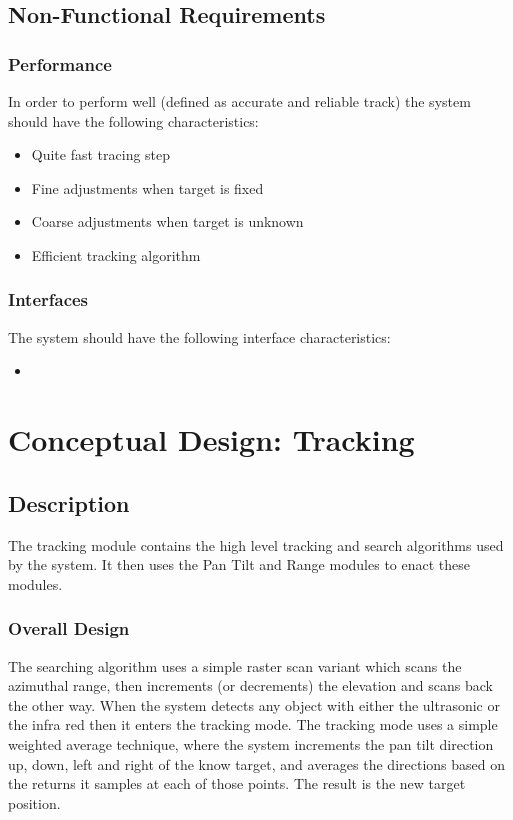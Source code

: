 \documentclass[]{report}
\begin{document}
\subsection{Non-Functional Requirements}
\subsubsection{Performance}
In order to perform well (defined as accurate and reliable track) the system should have the following characteristics:
\begin{itemize}
	\item Quite fast tracing step
	\item Fine adjustments when target is fixed
	\item Coarse adjustments when target is unknown
	\item Efficient tracking algorithm
\end{itemize}

\subsubsection{Interfaces}
The system should have the following interface characteristics:
\begin{itemize}
	\item 
\end{itemize}

\section{Conceptual Design: Tracking}
\subsection{Description}
The tracking module contains the high level tracking and search algorithms used by the system. It then uses the Pan Tilt and Range modules to enact these modules.

\subsubsection{Overall Design}
The searching algorithm uses a simple raster scan variant which scans the azimuthal range, then increments (or decrements) the elevation and scans back the other way. When the system detects any object with either the ultrasonic or the infra red then it enters the tracking mode. \newline
The tracking mode uses a simple weighted average technique, where the system increments the pan tilt direction up, down, left and right of the know target, and averages the directions based on the returns it samples at each of those points. The result is the new target position.
\end{document}
